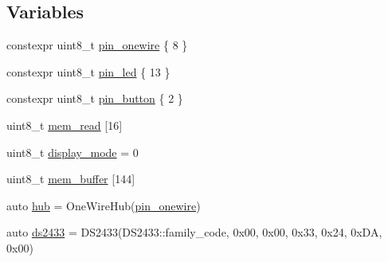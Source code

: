 \subsection*{Variables}
\begin{DoxyCompactItemize}
\item 
constexpr uint8\-\_\-t \hyperlink{OWH__DS2433__EEPROM__LCD_8ino_ad4f51a015485d98cc3a8a79f41a81027}{pin\-\_\-onewire} \{ 8 \}
\item 
constexpr uint8\-\_\-t \hyperlink{OWH__DS2433__EEPROM__LCD_8ino_add5a7eb759d22b21f8875663ed2c1528}{pin\-\_\-led} \{ 13 \}
\item 
constexpr uint8\-\_\-t \hyperlink{OWH__DS2433__EEPROM__LCD_8ino_a13a0c8ba7354e8bfab091549ab594ce5}{pin\-\_\-button} \{ 2 \}
\item 
uint8\-\_\-t \hyperlink{OWH__DS2433__EEPROM__LCD_8ino_a618ff393e228f15164df833cb5464dc7}{mem\-\_\-read} \mbox{[}16\mbox{]}
\item 
uint8\-\_\-t \hyperlink{OWH__DS2433__EEPROM__LCD_8ino_a7f9b7e8a2f8897f9d6221cc258f63896}{display\-\_\-mode} = 0
\item 
uint8\-\_\-t \hyperlink{OWH__DS2433__EEPROM__LCD_8ino_a768b8dfff3adb26417d2833fd19120ef}{mem\-\_\-buffer} \mbox{[}144\mbox{]}
\item 
auto \hyperlink{OWH__DS2433__EEPROM__LCD_8ino_a3beb275f1ae5db0a79499403dd2fbff8}{hub} = One\-Wire\-Hub(\hyperlink{OWH__DS2438__battMon__Test_8ino_ad4f51a015485d98cc3a8a79f41a81027}{pin\-\_\-onewire})
\item 
auto \hyperlink{OWH__DS2433__EEPROM__LCD_8ino_acfab931e46e8e28ffc06c70de2a7a806}{ds2433} = D\-S2433(D\-S2433\-::family\-\_\-code, 0x00, 0x00, 0x33, 0x24, 0x\-D\-A, 0x00)
\end{DoxyCompactItemize}


